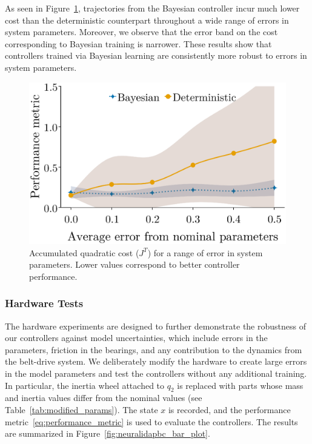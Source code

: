 As seen in Figure~\ref{fig:comparison_idapbc}, trajectories from the Bayesian
controller incur much lower cost than the deterministic counterpart throughout a
wide range of errors in system parameters.
%
Moreover, we observe that the error band on the cost corresponding to Bayesian
training is narrower.
%
These results show that controllers trained via Bayesian learning are
consistently more robust to errors in system parameters.
\begin{figure}[tb]
    \centering
    \includegraphics[clip,width=0.7\columnwidth]{./figures/bandplot1.eps}%
    \caption{
        Accumulated quadratic cost ($J^T$) for a range of error in system
        parameters. 
        Lower values correspond to better controller performance.
    }
    \label{fig:comparison_idapbc}
\end{figure}

\subsubsection{Hardware Tests} 

The hardware experiments are designed to further demonstrate the robustness of our
controllers against model uncertainties, which include errors in the parameters,
friction in the bearings, and any contribution to the dynamics from the
belt-drive system.
%
We deliberately modify the hardware to create large errors in the model
parameters and test the controllers without any additional training.
%
In particular, the inertia wheel attached to $q_2$ is replaced with parts whose
mass and inertia values differ from the nominal values (see
Table~\ref{tab:modified_params}). The state $x$ is recorded, and the performance
metric~\eqref{eq:performance_metric} is used to evaluate the controllers.
%
The results are summarized in Figure~\ref{fig:neuralidapbc_bar_plot}.

